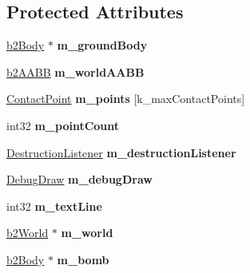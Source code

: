 \subsection*{Protected Attributes}
\begin{DoxyCompactItemize}
\item 
\hypertarget{class_test_a317e0a10bece62120632b2177cca72cb}{\hyperlink{classb2_body}{b2\-Body} $\ast$ {\bfseries m\-\_\-ground\-Body}}\label{class_test_a317e0a10bece62120632b2177cca72cb}

\item 
\hypertarget{class_test_ac1c97085c255562129e6e083f1669617}{\hyperlink{structb2_a_a_b_b}{b2\-A\-A\-B\-B} {\bfseries m\-\_\-world\-A\-A\-B\-B}}\label{class_test_ac1c97085c255562129e6e083f1669617}

\item 
\hypertarget{class_test_ab18ef4b491f25b7f52b7cca55863c278}{\hyperlink{struct_contact_point}{Contact\-Point} {\bfseries m\-\_\-points} \mbox{[}k\-\_\-max\-Contact\-Points\mbox{]}}\label{class_test_ab18ef4b491f25b7f52b7cca55863c278}

\item 
\hypertarget{class_test_a1c42f2908bb7ec1a04b2d2c35c974b05}{int32 {\bfseries m\-\_\-point\-Count}}\label{class_test_a1c42f2908bb7ec1a04b2d2c35c974b05}

\item 
\hypertarget{class_test_a1d407eb8533e2c310995e60c9abdb37c}{\hyperlink{class_destruction_listener}{Destruction\-Listener} {\bfseries m\-\_\-destruction\-Listener}}\label{class_test_a1d407eb8533e2c310995e60c9abdb37c}

\item 
\hypertarget{class_test_a639536a3e73f7cfa8a311559eef4d6a7}{\hyperlink{class_debug_draw}{Debug\-Draw} {\bfseries m\-\_\-debug\-Draw}}\label{class_test_a639536a3e73f7cfa8a311559eef4d6a7}

\item 
\hypertarget{class_test_a4f796421176f321ee8e82f82206c8445}{int32 {\bfseries m\-\_\-text\-Line}}\label{class_test_a4f796421176f321ee8e82f82206c8445}

\item 
\hypertarget{class_test_abdeaff78718316fcbfd3497cc45a7c58}{\hyperlink{classb2_world}{b2\-World} $\ast$ {\bfseries m\-\_\-world}}\label{class_test_abdeaff78718316fcbfd3497cc45a7c58}

\item 
\hypertarget{class_test_a0493fa0332a2f3c4fabff6e89db4fdef}{\hyperlink{classb2_body}{b2\-Body} $\ast$ {\bfseries m\-\_\-bomb}}\label{class_test_a0493fa0332a2f3c4fabff6e89db4fdef}


\end{DoxyCompactItemize}
